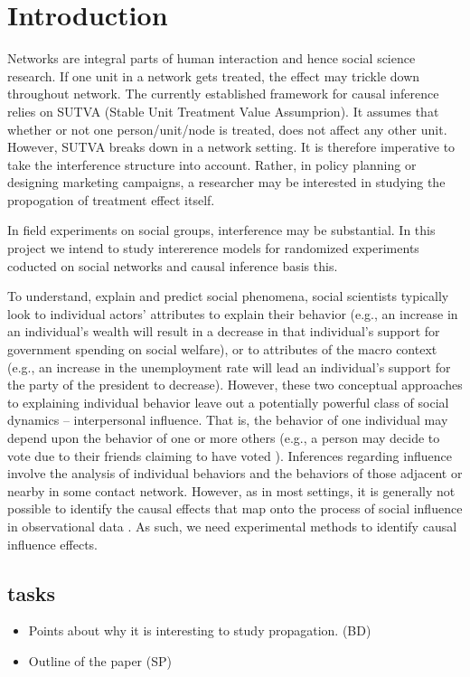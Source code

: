 \documentclass[12pt]{article}
\begin{document}
\thispagestyle{empty}
\doublespacing

\section{Introduction}

Networks are integral parts of human interaction and hence social science research. If one unit in a network gets treated, the effect may trickle down throughout network. The currently established framework for causal inference relies on SUTVA (Stable Unit Treatment Value Assumprion). It assumes that whether or not one person/unit/node is treated, does not affect any other unit. However, SUTVA breaks down in a network setting. It is therefore imperative to take the interference structure into account. Rather, in policy planning or designing marketing campaigns, a researcher may be interested in studying the propogation of treatment effect itself.

In field experiments on social groups, interference may be substantial. In this project we intend to study intererence models for randomized experiments coducted on social networks and causal inference basis this.

To understand, explain and predict social phenomena, social scientists typically look to individual actors' attributes to explain their behavior (e.g., an increase in an individual's wealth will result in a decrease in that individual's support for government spending on social welfare), or to attributes of the macro context (e.g., an increase in the unemployment rate will lead an individual's support for the party of the president to decrease). However, these two conceptual approaches to explaining individual behavior leave out a potentially powerful class of social dynamics -- interpersonal influence. That is, the behavior of one individual may depend upon the behavior of one or more others (e.g., a person may decide to vote due to their friends claiming to have voted \citep{Bond:2012}). Inferences regarding influence involve the analysis of individual behaviors and the behaviors of those adjacent or nearby in some contact network. However, as in most settings, it is generally not possible to identify the causal effects that map onto the process of social influence in observational data \citep{Shalizi:2011}. As such, we need experimental methods to identify causal influence effects.

\subsection{tasks}
\begin{itemize}
\item Points about why it is interesting to study propagation. (BD)
\item Outline of the paper (SP)
\end{itemize}
\end{document}
